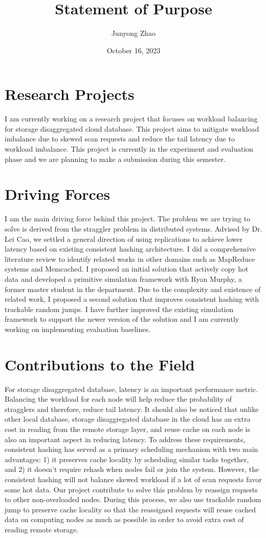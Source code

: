 \documentclass[12pt]{article}
\title{Statement of Purpose}
\author{Junyong Zhao}
\date{October 16, 2023}
\begin{document}
\maketitle

\section{Research Projects}
I am currently working on a research project that focuses on workload balancing
for storage disaggregated cloud database. This project aims to mitigate workload
imbalance due to skewed scan requests and reduce the tail latency due to
workload imbalance. This project is currently in the experiment and evaluation
phase and we are planning to make a submission during this semester.

\section{Driving Forces}
I am the main driving force behind this project. The problem we are trying to
solve is derived from the straggler problem in distributed systems. Advised by
Dr. Lei Cao, we settled a general direction of using replications to achieve
lower latency based on existing consistent hashing architecture. I did a
comprehensive literature review to identify related works in other domains such
as MapReduce systems and Memcached. I proposed an initial solution that actively
copy hot data and developed a primitive simulation framework with Ryan Murphy, a
former master student in the department. Due to the complexity and existence of
related work, I proposed a second solution that improves consistent hashing with
trackable random jumps. I have further improved the existing simulation
framework to support the newer version of the solution and I am currently
working on implementing evaluation baselines.

\section{Contributions to the Field}
For storage disaggregated database, latency is an important performance metric.
Balancing the workload for each node will help reduce the probability of
stragglers and therefore, reduce tail latency. It should also be noticed that
unlike other local database, storage disaggregated database in the cloud has an
extra cost in reading from the remote storage layer, and reuse cache on each
node is also an important aspect in reducing latency. To address these
requirements, consistent hashing has served as a primary scheduling mechanism
with two main advantages: 1) it preserves cache locality by scheduling similar
tasks together, and 2) it doesn't require rehash when nodes fail or join the
system. However, the consistent hashing will not balance skewed workload if a
lot of scan requests favor some hot data. Our project contribute to solve this
problem by reassign requests to other non-overloaded nodes. During this process,
we also use trackable random jump to preserve cache locality so that the
reassigned requests will reuse cached data on computing nodes as much as
possible in order to avoid extra cost of reading remote storage.
\end{document}
